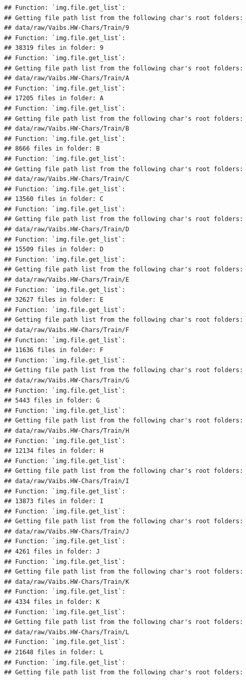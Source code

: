 \documentclass[
]{report}
\begin{document}
\begin{verbatim}
## Function: `img.file.get_list`:
## Getting file path list from the following char's root folders:
## data/raw/Vaibs.HW-Chars/Train/9
## Function: `img.file.get_list`:
## 38319 files in folder: 9
## Function: `img.file.get_list`:
## Getting file path list from the following char's root folders:
## data/raw/Vaibs.HW-Chars/Train/A
## Function: `img.file.get_list`:
## 17205 files in folder: A
## Function: `img.file.get_list`:
## Getting file path list from the following char's root folders:
## data/raw/Vaibs.HW-Chars/Train/B
## Function: `img.file.get_list`:
## 8666 files in folder: B
## Function: `img.file.get_list`:
## Getting file path list from the following char's root folders:
## data/raw/Vaibs.HW-Chars/Train/C
## Function: `img.file.get_list`:
## 13560 files in folder: C
## Function: `img.file.get_list`:
## Getting file path list from the following char's root folders:
## data/raw/Vaibs.HW-Chars/Train/D
## Function: `img.file.get_list`:
## 15509 files in folder: D
## Function: `img.file.get_list`:
## Getting file path list from the following char's root folders:
## data/raw/Vaibs.HW-Chars/Train/E
## Function: `img.file.get_list`:
## 32627 files in folder: E
## Function: `img.file.get_list`:
## Getting file path list from the following char's root folders:
## data/raw/Vaibs.HW-Chars/Train/F
## Function: `img.file.get_list`:
## 11636 files in folder: F
## Function: `img.file.get_list`:
## Getting file path list from the following char's root folders:
## data/raw/Vaibs.HW-Chars/Train/G
## Function: `img.file.get_list`:
## 5443 files in folder: G
## Function: `img.file.get_list`:
## Getting file path list from the following char's root folders:
## data/raw/Vaibs.HW-Chars/Train/H
## Function: `img.file.get_list`:
## 12134 files in folder: H
## Function: `img.file.get_list`:
## Getting file path list from the following char's root folders:
## data/raw/Vaibs.HW-Chars/Train/I
## Function: `img.file.get_list`:
## 13873 files in folder: I
## Function: `img.file.get_list`:
## Getting file path list from the following char's root folders:
## data/raw/Vaibs.HW-Chars/Train/J
## Function: `img.file.get_list`:
## 4261 files in folder: J
## Function: `img.file.get_list`:
## Getting file path list from the following char's root folders:
## data/raw/Vaibs.HW-Chars/Train/K
## Function: `img.file.get_list`:
## 4334 files in folder: K
## Function: `img.file.get_list`:
## Getting file path list from the following char's root folders:
## data/raw/Vaibs.HW-Chars/Train/L
## Function: `img.file.get_list`:
## 21648 files in folder: L
## Function: `img.file.get_list`:
## Getting file path list from the following char's root folders:

\end{verbatim}
\end{document}
